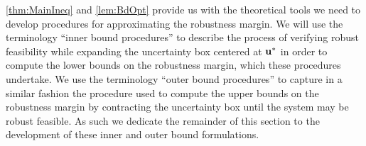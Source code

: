 \cref{thm:MainIneq} and \cref{lem:BdOpt} provide us with the theoretical tools we need to develop procedures for approximating the robustness margin.
We will use the terminology \enquote{inner bound procedures} to describe the process of verifying robust feasibility while expanding the uncertainty box centered at $\mathbf{u}^*$ in order to compute the lower bounds on the robustness margin, which these procedures undertake. 
We use the terminology \enquote{outer bound procedures} to capture in a similar fashion the procedure used to compute the upper bounds on the robustness margin by contracting the uncertainty box until the system may be robust feasible. 
As such we dedicate the remainder of this section to the development of these inner and outer bound formulations. 
